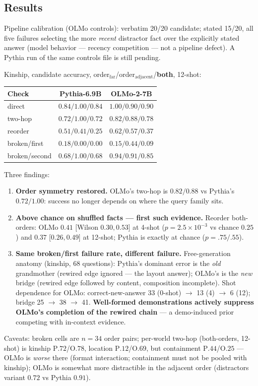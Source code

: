 \documentclass[11pt,a4paper]{article}
\begin{document}
\subsection{Results}
Pipeline calibration (OLMo controls): verbatim 20/20 candidate; stated 15/20, all five failures selecting the more \emph{recent} distractor fact over the explicitly stated answer (model behavior --- recency competition --- not a pipeline defect). A Pythia run of the same controls file is still pending.

Kinship, candidate accuracy, order$_{\mathrm{far}}$/order$_{\mathrm{adjacent}}$/\textbf{both}, 12-shot:
\begin{center}\small
\begin{tabular}{lcc}
\toprule
Check & Pythia-6.9B & OLMo-2-7B\\\midrule
direct & $0.84/1.00/\mathbf{0.84}$ & $1.00/0.90/\mathbf{0.90}$\\
two-hop & $0.72/1.00/\mathbf{0.72}$ & $0.82/0.88/\mathbf{0.78}$\\
reorder & $0.51/0.41/\mathbf{0.25}$ & $0.62/0.57/\mathbf{0.37}$\\
broken/first & $0.18/0.00/\mathbf{0.00}$ & $0.15/0.44/\mathbf{0.09}$\\
broken/second & $0.68/1.00/\mathbf{0.68}$ & $0.94/0.91/\mathbf{0.85}$\\
\bottomrule
\end{tabular}
\end{center}
Three findings:
\begin{enumerate}
\item \textbf{Order symmetry restored.} OLMo's two-hop is $0.82/0.88$ vs Pythia's $0.72/1.00$: success no longer depends on where the query family sits.
\item \textbf{Above chance on shuffled facts --- first such evidence.} Reorder both-orders: OLMo $0.41$ [Wilson $0.30,0.53$] at 4-shot ($p=2.5\times10^{-3}$ vs chance $0.25$) and $0.37$ [$0.26,0.49$] at 12-shot; Pythia is exactly at chance ($p=.75/.55$).
\item \textbf{Same broken/first failure rate, different failure.} Free-generation anatomy (kinship, 68 questions): Pythia's dominant error is the \emph{old} grandmother (rewired edge ignored --- the layout answer); OLMo's is the \emph{new} bridge (rewired edge followed by content, composition incomplete). Shot dependence for OLMo: correct-new-answer 33 (0-shot) $\to$ 13 (4) $\to$ 6 (12); bridge 25 $\to$ 38 $\to$ 41. \textbf{Well-formed demonstrations actively suppress OLMo's completion of the rewired chain} --- a demo-induced prior competing with in-context evidence.
\end{enumerate}
Caveats: broken cells are $n{=}34$ order pairs; per-world two-hop (both-orders, 12-shot) is kinship P$.72$/O$.78$, location P$.12$/O$.69$, but containment P$.44$/O$.25$ --- OLMo is \emph{worse} there (format interaction; containment must not be pooled with kinship); OLMo is somewhat more distractible in the adjacent order (distractors variant $0.72$ vs Pythia $0.91$).
\end{document}
